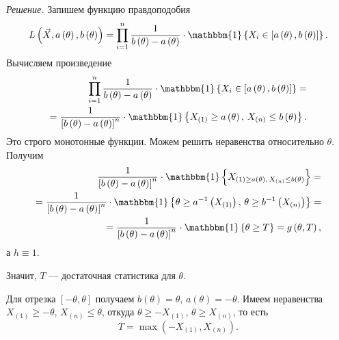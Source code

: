 \textit{Решение.} Запишем функцию правдоподобия
$$L \left( \vec{X}, a \left( \theta \right), b \left( \theta \right) \right) =
  \prod \limits_{i = 1}^n
    \frac{1}{b \left( \theta \right) - a \left( \theta \right) } \cdot
    \mathbbm{1} \left\{
      X_i \in \left[ a \left( \theta \right), b \left( \theta \right) \right]
    \right\}.$$
Вычисляем произведение
\begin{equation*}
  \begin{split}
    \prod \limits_{i = 1}^n
      \frac{1}{b \left( \theta \right) - a \left( \theta \right) } \cdot
      \mathbbm{1} \left\{
        X_i \in \left[ a \left( \theta \right), b \left( \theta \right) \right]
      \right\} = \\
    = \frac{1}{ \left[ b \left( \theta \right) - a \left( \theta \right) \right]^n} \cdot
    \mathbbm{1} \left\{
      X_{ \left( 1 \right) } \geq a \left( \theta \right), \,
      X_{ \left( n \right) } \leq b \left( \theta \right)
    \right\}.
  \end{split}
\end{equation*}
Это строго монотонные функции.
Можем решить неравенства относительно $ \theta $.
Получим
\begin{equation*}
  \begin{split}
    \frac{1}{ \left[ b \left( \theta \right) - a \left( \theta \right) \right]^n} \cdot
  \mathbbm{1} \left\{
      X_{ \left( 1 \right) \geq a \left( \theta \right), \,
      X_{ \left( n \right) } \leq b \left( \theta \right) }
    \right\} = \\
    = \frac{1}{ \left[ b \left( \theta \right) - a \left( \theta \right) \right]^n} \cdot
    \mathbbm{1} \left\{
      \theta \geq a^{-1} \left( X_{ \left( 1 \right) } \right), \,
      \theta \geq b^{-1} \left( X_{ \left( n \right) } \right)
    \right\} = \\
    = \frac{1}{ \left[ b \left( \theta \right) - a \left( \theta \right) \right]^n} \cdot
    \mathbbm{1} \left\{ \theta \geq T \right\} =
    g \left( \theta, T \right),
  \end{split}
\end{equation*}
а $h \equiv 1$.

Значит, $T$ --- достаточная статистика для $ \theta $.

Для отрезка $ \left[ - \theta, \theta \right] $ получаем
$b \left( \theta \right) = \theta, \, a \left( \theta \right) = - \theta $.
Имеем неравенства $X_{ \left( 1 \right) } \geq - \theta, \, X_{ \left( n \right) } \leq \theta $,
откуда $ \theta \geq - X_{ \left( 1 \right) }, \, \theta \geq X_{ \left( n \right) }$, то есть
$$T =
  \max \left( -X_{ \left( 1 \right) }, X_{ \left( n \right) } \right).$$
